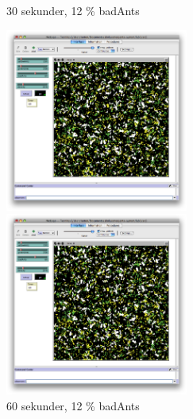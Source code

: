 \documentclass[titlepage, a4paper, 12pt]{article}
\begin{document}
\begin{figure}
  \begin{minipage}[b]{0.5\linewidth} %
    \centering
    \caption{30 sekunder, 12 \% badAnts}
    \includegraphics[width=6cm]{images/60-bad-60.png}
  \end{minipage}
  \hspace{0.5cm} %
  \begin{minipage}[b]{0.5\linewidth}
    \centering
    \caption{60 sekunder, 12 \% badAnts}
    \includegraphics[width=6cm]{images/60-bad-60.png}
  \end{minipage}


\end{figure}
\end{document}
